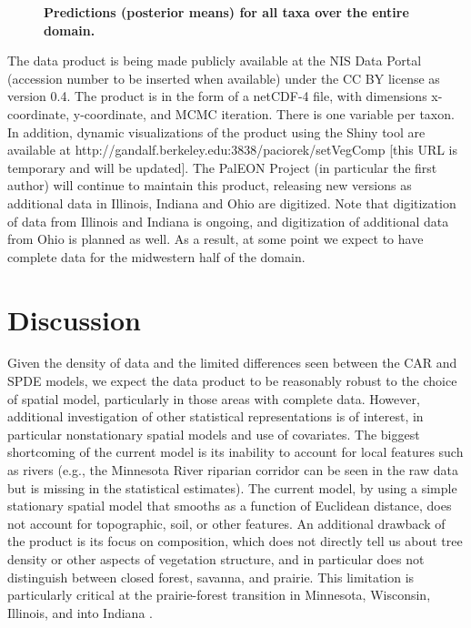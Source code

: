 \documentclass[10pt,letterpaper]{article}
\begin{document}
\begin{figure}

\caption{{\bf Predictions (posterior means) for all taxa over the entire domain.}}
\label{fig:all_predictions}

\end{figure}


The data product is being made publicly available at the NIS Data
Portal (accession number to be inserted when available) under the
CC BY license as version 0.4. The product is in
the form of a netCDF-4 file, with dimensions x-coordinate, y-coordinate,
and MCMC iteration. There is one variable per taxon. In addition,
dynamic visualizations of the product using the Shiny tool are available
at http://gandalf.berkeley.edu:3838/paciorek/setVegComp [this URL
is temporary and will be updated]. The PalEON Project (in particular
the first author) will continue to maintain this product, releasing
new versions as additional data in Illinois, Indiana and Ohio are
digitized. Note that digitization of data from Illinois and Indiana
is ongoing, and digitization of additional data from Ohio is planned
as well. As a result, at some point we expect to have complete data
for the midwestern half of the domain. 

\section*{Discussion}\label{sec:Discussion}


Given the density of data and the limited differences seen between
the CAR and SPDE models, we expect the data product to be reasonably
robust to the choice of spatial model, particularly in those areas
with complete data. However, additional investigation of other statistical
representations is of interest, in particular nonstationary spatial
models and use of covariates. The biggest shortcoming of the current
model is its inability to account for local features such as rivers
(e.g., the Minnesota River riparian corridor can be seen in the raw
data but is missing in the statistical estimates). The current model,
by using a simple stationary spatial model that smooths as a function
of Euclidean distance, does not account for topographic, soil, or
other features. An additional drawback of the product is its focus
on composition, which does not directly tell us about tree density
or other aspects of vegetation structure, and in particular does not
distinguish between closed forest, savanna, and prairie. This limitation
is particularly critical at the prairie-forest transition in Minnesota,
Wisconsin, Illinois, and into Indiana \cite{transeau1935prairie}.
\end{document}
